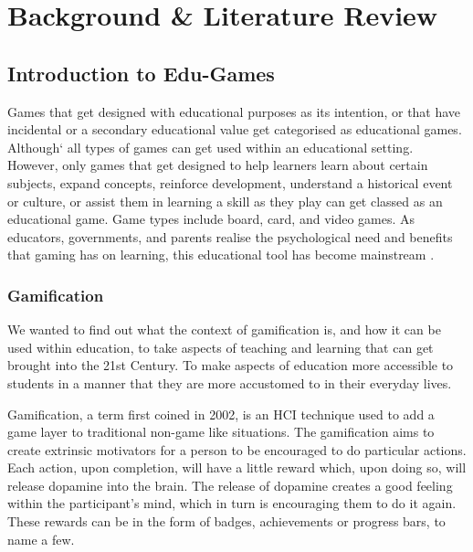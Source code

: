 \chapter{Background \& Literature Review}
	\label{chap:background_lit_review}
	
	
	\section{Introduction to Edu-Games}
		\label{sec:intro_to_edu_games}
	
	Games that get designed with educational purposes as its intention, or that have incidental or a secondary educational value get categorised as educational games. Although` all types of games can get used within an educational setting. However, only games that get designed to help learners learn about certain subjects, expand concepts, reinforce development, understand a historical event or culture, or assist them in learning a skill as they play can get classed as an educational game. Game types include board, card, and video games. As educators, governments, and parents realise the psychological need and benefits that gaming has on learning, this educational tool has become mainstream \cite{barab2009transformational}. 
	
	
	\subsection{Gamification}
	We wanted to find out what the context of gamification is, and how it can be used within education, to take aspects of teaching and learning that can get brought into the 21st Century. To make aspects of education more accessible to students in a manner that they are more accustomed to in their everyday lives. 
	
	Gamification, a term first coined in 2002, is an HCI technique used to add a game layer to traditional non-game like situations. The gamification aims to create extrinsic motivators for a person to be encouraged to do particular actions. Each action, upon completion, will have a little reward which, upon doing so, will release dopamine into the brain. The release of dopamine creates a good feeling within the participant's mind, which in turn is encouraging them to do it again. These rewards can be in the form of badges, achievements or progress bars, to name a few.
	

